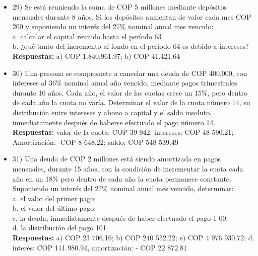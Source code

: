 \begin{itemize}
 \item 29)	 Se está reuniendo la suma de COP 5 millones mediante depósitos mensuales durante 8 años. Si los depósitos aumentan de valor cada mes COP 200 y suponiendo un interés del 27\% nominal anual mes vencido:\\
       a.	calcular el capital reunido hasta el período 63 \\
       b.	¿qué tanto del incremento al fondo en el período 64 es debido a intereses? \\
       \textbf{Respuestas: }a) COP 1.840.961.97;  b) COP 41.421.64
       \medskip

 \item 30)	 Una persona se compromete a cancelar una deuda de COP 400.000, con intereses al 36\% nominal anual año vencido, mediante pagos trimestrales durante 10 años. Cada año, el valor de las cuotas crece un 15\%, pero dentro de cada año la cuota no varía. Determinar el valor de la cuota número 14, su distribución entre intereses y abono a capital y el saldo insoluto, inmediatamente después de haberse efectuado el pago número 14.\\
       \textbf{Respuestas:} valor de la cuota: COP 39 942; 	intereses: COP 48 590.21;
       Amortización: -COP 8 648.22;       saldo: COP 548 539.49\\
       \medskip

 \item 31)	 Una deuda de COP 2 millones está siendo amortizada en pagos mensuales, durante 15 años, con la condición de incrementar la cuota cada año en un 18\% pero dentro de cada año la cuota permanece constante. Suponiendo un interés del 27\% nominal anual mes vencido, determinar:\\
       a.	el valor del primer pago; \\
       b.	el valor del último pago; \\
       c.	 la deuda, inmediatamente después de haber efectuado el pago 1 00; \\
       d.	la distribución del pago 101. \\
       \textbf{Respuestas: }a) COP 23 706.16;	 b) COP 240 552.22; 	e) COP 4 976 930.72;
       d. interés: COP 111 980.94, amortización: - COP 22 872.81
       \medskip


\end{itemize}

